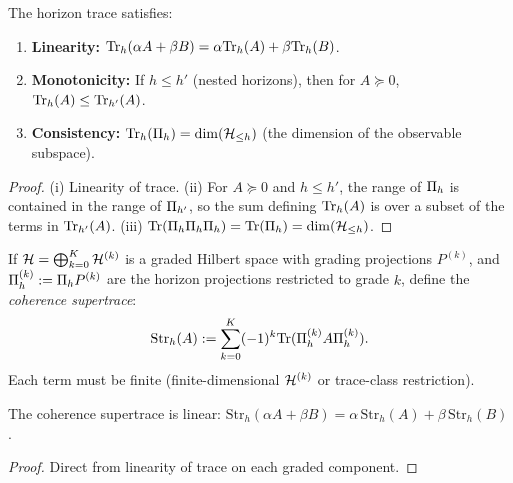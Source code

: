 \begin{lemma}
\label{lem:horizon-trace-properties}
The horizon trace satisfies:
\begin{enumerate}[label=(\roman*)]
\item \textbf{Linearity:} $\mathrm{Tr}_{h}(\alpha A + \beta B) = \alpha \mathrm{Tr}_{h}(A) + \beta \mathrm{Tr}_{h}(B)$.
\item \textbf{Monotonicity:} If $h \le h'$ (nested horizons), then for $A \succeq 0$, $\mathrm{Tr}_{h}(A) \le \mathrm{Tr}_{h'}(A)$.
\item \textbf{Consistency:} $\mathrm{Tr}_{h}(\Pi_{h}) = \dim(\mathcal{H}_{\le h})$ (the dimension of the observable subspace).
\end{enumerate}
\end{lemma}

\begin{proof}
(i) Linearity of trace.
(ii) For $A \succeq 0$ and $h \le h'$, the range of $\Pi_{h}$ is contained in the range of $\Pi_{h'}$, so the sum defining $\mathrm{Tr}_{h}(A)$ is over a subset of the terms in $\mathrm{Tr}_{h'}(A)$.
(iii) $\mathrm{Tr}(\Pi_{h} \Pi_{h} \Pi_{h}) = \mathrm{Tr}(\Pi_{h}) = \dim(\mathcal{H}_{\le h})$.
\end{proof}

\begin{definition}
\label{def:supertrace}
If $\mathcal{H} = \bigoplus_{k=0}^{K} \mathcal{H}^{(k)}$ is a graded Hilbert space with grading projections $P^{(k)}$, and $\Pi_{h}^{(k)} := \Pi_{h} P^{(k)}$ are the horizon projections restricted to grade $k$, define the \emph{coherence supertrace}:
\[
\mathrm{Str}_h(A) := \sum_{k=0}^{K} (-1)^k \mathrm{Tr}(\Pi_{h}^{(k)} A \Pi_{h}^{(k)}).
\]
Each term must be finite (finite-dimensional $\mathcal{H}^{(k)}$ or trace-class restriction).
\end{definition}

\begin{lemma}
\label{lem:supertrace-linear}
The coherence supertrace is linear: $\mathrm{Str}_h(\alpha A + \beta B) = \alpha \, \mathrm{Str}_h(A) + \beta \, \mathrm{Str}_h(B)$.
\end{lemma}

\begin{proof}
Direct from linearity of trace on each graded component.
\end{proof}

